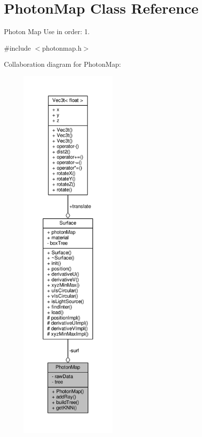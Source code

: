 \hypertarget{classPhotonMap}{}\section{Photon\+Map Class Reference}
\label{classPhotonMap}


Photon Map Use in order\+: 1.  




{\ttfamily \#include $<$photonmap.\+h$>$}



Collaboration diagram for Photon\+Map\+:
\nopagebreak
\begin{figure}[H]
\begin{center}
\leavevmode
\includegraphics[height=550pt]{classPhotonMap__coll__graph}
\end{center}
\end{figure}
